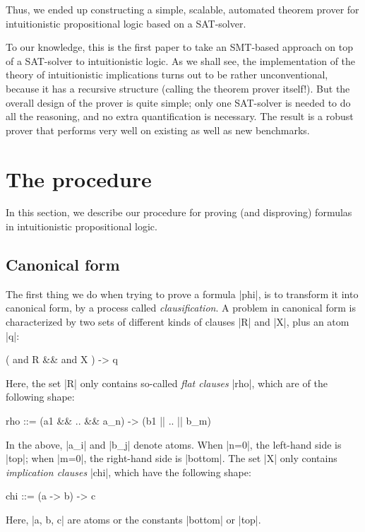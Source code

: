\documentclass{llncs}
\begin{document}
Thus, we ended up constructing a simple, scalable, automated theorem prover for intuitionistic propositional logic based on a SAT-solver.

To our knowledge, this is the first paper to take an SMT-based approach on top of a SAT-solver to intuitionistic logic. As we shall see, the implementation of the theory of intuitionistic implications turns out to be rather unconventional, because it has a recursive structure (calling the theorem prover itself!). But the overall design of the prover is quite simple; only one SAT-solver is needed to do all the reasoning, and no extra quantification is necessary. The result is a robust prover that performs very well on existing as well as new benchmarks.


\section{The procedure}

In this section, we describe our procedure for proving (and disproving) formulas in intuitionistic propositional logic.

\subsection{Canonical form}

The first thing we do when trying to prove a formula |phi|, is to transform it into canonical form, by a process called {\em clausification}. A problem in canonical form is characterized by two sets of different kinds of clauses |R| and |X|, plus an atom |q|:
\begin{code}
( and R && and X ) -> q
\end{code}
Here, the set |R| only contains so-called {\em flat clauses} |rho|, which are of the following shape:
\begin{code}
rho  ::=  (a1 && .. && a_n) -> (b1 || .. || b_m)
\end{code}
In the above, |a_i| and |b_j| denote atoms. When |n=0|, the left-hand side is |top|; when |m=0|, the right-hand side is |bottom|.
The set |X| only contains {\em implication clauses} |chi|, which have the following shape:
\begin{code}
chi  ::=  (a -> b) -> c
\end{code}
Here, |a, b, c| are atoms or the constants |bottom| or |top|.
\end{document}
